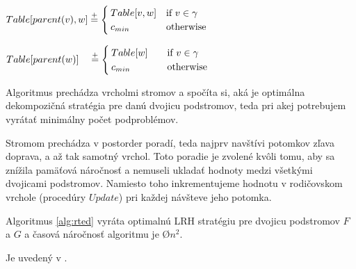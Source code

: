 \begin{algorithm}
\begin{algorithmic}[1]
  \item[]

      \State $Table[parent(v), w] \stackrel{+}{=}
        \begin{cases}
          Table[v, w] & \text{if $v \in \gamma$}
          \\
          c_{min} & \text{otherwise}
        \end{cases}$
    \EndProcedure

      \State $Table[parent(w)] \quad \stackrel{+}{=}
        \begin{cases}
          Table[w] & \quad \text{if $v \in \gamma$}
          \\
          c_{min} & \quad \text{otherwise}
        \end{cases}$
    \EndProcedure
  \end{algorithmic}
\end{algorithm}

Algoritmus prechádza vrcholmi stromov a spočíta si, aká je optimálna dekompozičná stratégia
pre danú dvojicu podstromov, teda pri akej potrebujem vyrátať minimálny počet podproblémov.

Stromom prechádza v postorder poradí, teda najprv navštívi potomkov zľava doprava, a až tak
samotný vrchol.
Toto poradie je zvolené kvôli tomu, aby sa znížila pamäťová náročnosť a nemuseli ukladať hodnoty
medzi všetkými dvojicami podstromov. Namiesto toho inkrementujeme hodnotu v rodičovskom vrchole
(procedúry $Update$) pri každej návšteve jeho potomka.

\begin{lemma}
  Algoritmus \ref{alg:rted} vyráta optimalnú LRH stratégiu pre dvojicu podstromov $F$ a $G$ a
  časová náročnosť algoritmu je \O{$n^2$}.
\end{lemma}

\begin{dukaz}
  Je uvedený v \citet{RTED}.
\end{dukaz}

